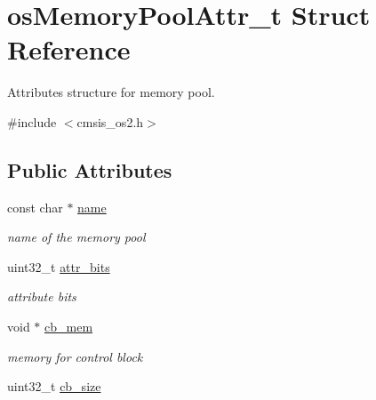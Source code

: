 \hypertarget{structos_memory_pool_attr__t}{}\section{os\+Memory\+Pool\+Attr\+\_\+t Struct Reference}
\label{structos_memory_pool_attr__t}


Attributes structure for memory pool.  




{\ttfamily \#include $<$cmsis\+\_\+os2.\+h$>$}

\subsection*{Public Attributes}
\begin{DoxyCompactItemize}
\item 
\mbox{\label{structos_memory_pool_attr__t_a1a14604293f5327ce10f33f67f718679}} 
const char $\ast$ \mbox{\hyperlink{structos_memory_pool_attr__t_a1a14604293f5327ce10f33f67f718679}{name}}
\begin{DoxyCompactList}\small\item\em name of the memory pool \end{DoxyCompactList}\item 
\mbox{\label{structos_memory_pool_attr__t_a855bf6d976d2457a2fe76b0285fa140a}} 
uint32\+\_\+t \mbox{\hyperlink{structos_memory_pool_attr__t_a855bf6d976d2457a2fe76b0285fa140a}{attr\+\_\+bits}}
\begin{DoxyCompactList}\small\item\em attribute bits \end{DoxyCompactList}\item 
\mbox{\label{structos_memory_pool_attr__t_a429ab7932bd1acff955ece56f51b2fe1}} 
void $\ast$ \mbox{\hyperlink{structos_memory_pool_attr__t_a429ab7932bd1acff955ece56f51b2fe1}{cb\+\_\+mem}}
\begin{DoxyCompactList}\small\item\em memory for control block \end{DoxyCompactList}\item 
\mbox{\label{structos_memory_pool_attr__t_ac503c59e0429dd8bb57058ac6264a3b7}} 
uint32\+\_\+t \mbox{\hyperlink{structos_memory_pool_attr__t_ac503c59e0429dd8bb57058ac6264a3b7}{cb\+\_\+size}}

\end{DoxyCompactItemize}
